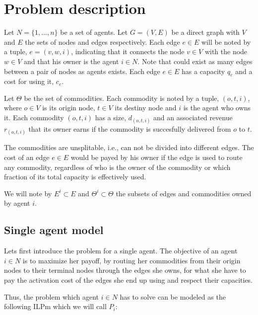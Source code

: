 \documentclass{article}
\begin{document}
\section{Problem description}

Let $N=\{1,...,n\}$ be a set of agents. Let $G=(V,E)$ be a direct graph with $V$ and $E$ the sets
of nodes and edges respectively. Each edge $e \in E$ will be noted by a tuple, $e=(v,w,i)$, indicating that it 
connects the node $v\in V$ with the node $w \in V$ and that his owner is the agent $i\in N$. Note that could exist as
many edges between a pair of nodes as agents exists. Each edge $e \in E$ has a capacity $q_e$ and a cost for using it, $c_e$.

Let $\Theta$ be the set of commodities. Each commodity is noted by a tuple, $(o,t,i)$, where $o\in V$ is its origin
node, $t\in V$ its destiny node and $i$ is the agent who owns it. Each commodity $(o,t,i)$ has a size, $d_{(o,t,i)}$
and an associated revenue $r_{(o,t,i)}$ that its owner earns if the commodity is succesfully delivered from $o$ to $t$.

The commodities are unsplitable, i.e., can not be divided into different edges. The cost of an edge $e \in E$ would be payed 
by his owner if the edge is used to route any commodity, regardless of who is the owner of the commodity
or which fraction of its total capacity is effectively used.

We will note by $E^i \subset E$ and $\Theta^i\subset \Theta$ the subsets of edges and commodities owned by agent $i$.


\subsection{Single agent model}

Lets first introduce the problem for a single agent. The objective of an agent 
$i \in N$ is to maximize her payoff, by routing her commodities from their origin nodes
to their terminal nodes through the edges she owns, for what she have to pay the
activation cost of the edges she end up using and respect their capacities.

Thus, the problem which agent $i\in N$ has to solve can be modeled as the following
ILPm which we will call $P_i$:
\end{document}
